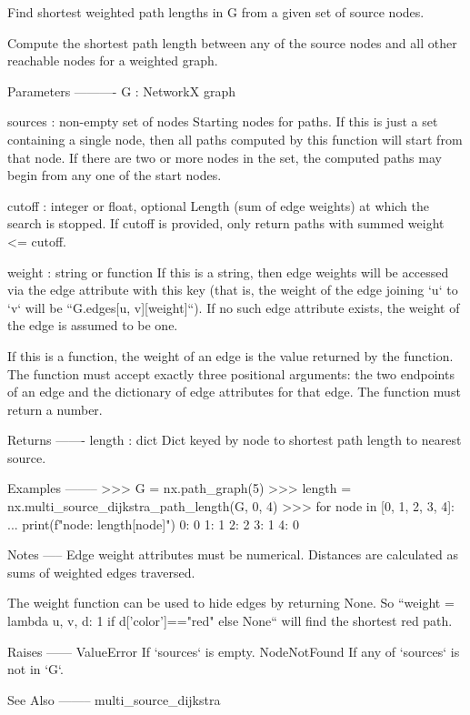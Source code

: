 \begin{DoxyVerb}Find shortest weighted path lengths in G from a given set of
source nodes.

Compute the shortest path length between any of the source nodes and
all other reachable nodes for a weighted graph.

Parameters
----------
G : NetworkX graph

sources : non-empty set of nodes
    Starting nodes for paths. If this is just a set containing a
    single node, then all paths computed by this function will start
    from that node. If there are two or more nodes in the set, the
    computed paths may begin from any one of the start nodes.

cutoff : integer or float, optional
    Length (sum of edge weights) at which the search is stopped.
    If cutoff is provided, only return paths with summed weight <= cutoff.

weight : string or function
    If this is a string, then edge weights will be accessed via the
    edge attribute with this key (that is, the weight of the edge
    joining `u` to `v` will be ``G.edges[u, v][weight]``). If no
    such edge attribute exists, the weight of the edge is assumed to
    be one.

    If this is a function, the weight of an edge is the value
    returned by the function. The function must accept exactly three
    positional arguments: the two endpoints of an edge and the
    dictionary of edge attributes for that edge. The function must
    return a number.

Returns
-------
length : dict
    Dict keyed by node to shortest path length to nearest source.

Examples
--------
>>> G = nx.path_graph(5)
>>> length = nx.multi_source_dijkstra_path_length(G, {0, 4})
>>> for node in [0, 1, 2, 3, 4]:
...     print(f"{node}: {length[node]}")
0: 0
1: 1
2: 2
3: 1
4: 0

Notes
-----
Edge weight attributes must be numerical.
Distances are calculated as sums of weighted edges traversed.

The weight function can be used to hide edges by returning None.
So ``weight = lambda u, v, d: 1 if d['color']=="red" else None``
will find the shortest red path.

Raises
------
ValueError
    If `sources` is empty.
NodeNotFound
    If any of `sources` is not in `G`.

See Also
--------
multi_source_dijkstra\end{DoxyVerb}
 \mbox{\label{namespacenetworkx_1_1algorithms_1_1shortest__paths_1_1weighted_adfecc0f26108aa59e45335af3a3c4357}} 
